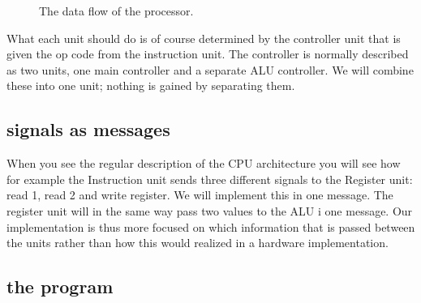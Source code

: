 \documentclass[a4paper,11pt]{article}
\begin{document}
\begin{figure}
  \centering 
  \caption{The data flow of the processor.} \label{fig:flow}
\end{figure}

What each unit should do is of course determined by the controller
unit that is given the op code from the instruction unit. The controller is
normally described as two units, one main controller and a separate
ALU controller. We will combine these into one unit; nothing is gained
by separating them.


\subsection*{signals as messages}

When you see the regular description of the CPU architecture you will
see how for example the Instruction unit sends three different signals to
the Register unit: read 1, read 2 and write register. We will
implement this in one message. The register unit will in the same way
pass two values to the ALU i one message.  Our implementation is thus
more focused on which information that is passed between the units
rather than how this would realized in a hardware implementation.

\subsection*{the program}
\end{document}
